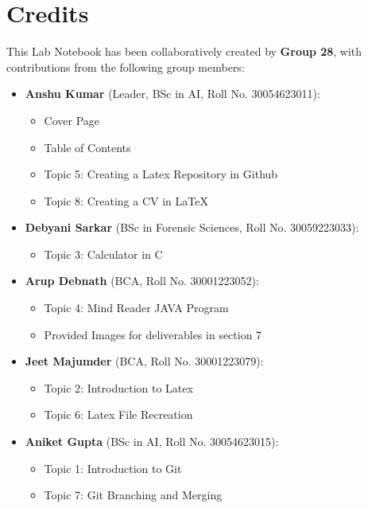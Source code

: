 \section*{Credits}

This Lab Notebook has been collaboratively created by \textbf{Group 28}, with contributions from the following group members:

\begin{itemize}
    \item \textbf{Anshu Kumar} (Leader, BSc in AI, Roll No. 30054623011):
    \begin{itemize}
        \item Cover Page
        \item Table of Contents
        \item Topic 5: Creating a Latex Repository in Github
        \item Topic 8: Creating a CV in LaTeX
    \end{itemize}
    
    \item \textbf{Debyani Sarkar} (BSc in Forensic Sciences, Roll No. 30059223033):
    \begin{itemize}
        \item Topic 3: Calculator in C
    \end{itemize}
    
    \item \textbf{Arup Debnath} (BCA, Roll No. 30001223052):
    \begin{itemize}
        \item Topic 4: Mind Reader JAVA Program
        \item Provided Images for deliverables in section 7
    \end{itemize}
    
    \item \textbf{Jeet Majumder} (BCA, Roll No. 30001223079):
    \begin{itemize}
        \item Topic 2: Introduction to Latex
        \item Topic 6: Latex File Recreation
    \end{itemize}
    
    \item \textbf{Aniket Gupta} (BSc in AI, Roll No. 30054623015):
    \begin{itemize}
        \item Topic 1: Introduction to Git
        \item Topic 7: Git Branching and Merging
    \end{itemize}
    
\end{itemize}